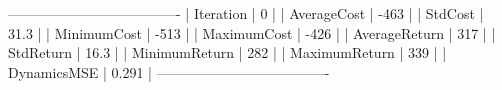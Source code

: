 -------------------------------------
|       Iteration |               0 |
|     AverageCost |            -463 |
|         StdCost |            31.3 |
|     MinimumCost |            -513 |
|     MaximumCost |            -426 |
|   AverageReturn |             317 |
|       StdReturn |            16.3 |
|   MinimumReturn |             282 |
|   MaximumReturn |             339 |
|     DynamicsMSE |           0.291 |
-------------------------------------
